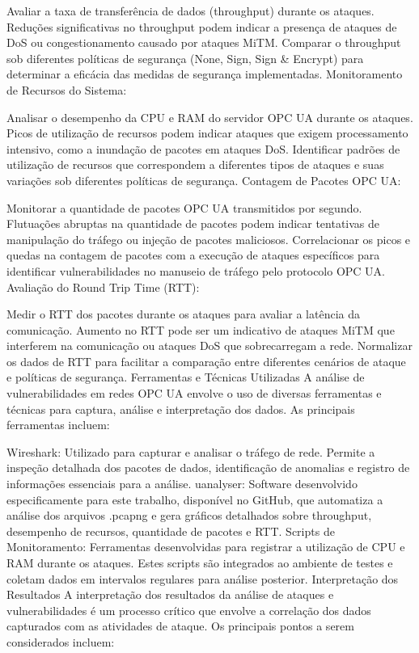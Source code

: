{    Avaliar a taxa de transferência de dados (throughput) durante os ataques. Reduções significativas no throughput podem indicar a presença de ataques de DoS ou congestionamento causado por ataques MiTM.
    Comparar o throughput sob diferentes políticas de segurança (None, Sign, Sign \& Encrypt) para determinar a eficácia das medidas de segurança implementadas.
    Monitoramento de Recursos do Sistema:

    Analisar o desempenho da CPU e RAM do servidor OPC UA durante os ataques. Picos de utilização de recursos podem indicar ataques que exigem processamento intensivo, como a inundação de pacotes em ataques DoS.
    Identificar padrões de utilização de recursos que correspondem a diferentes tipos de ataques e suas variações sob diferentes políticas de segurança.
    Contagem de Pacotes OPC UA:

    Monitorar a quantidade de pacotes OPC UA transmitidos por segundo. Flutuações abruptas na quantidade de pacotes podem indicar tentativas de manipulação do tráfego ou injeção de pacotes maliciosos.
    Correlacionar os picos e quedas na contagem de pacotes com a execução de ataques específicos para identificar vulnerabilidades no manuseio de tráfego pelo protocolo OPC UA.
    Avaliação do Round Trip Time (RTT):

    Medir o RTT dos pacotes durante os ataques para avaliar a latência da comunicação. Aumento no RTT pode ser um indicativo de ataques MiTM que interferem na comunicação ou ataques DoS que sobrecarregam a rede.
    Normalizar os dados de RTT para facilitar a comparação entre diferentes cenários de ataque e políticas de segurança.
    Ferramentas e Técnicas Utilizadas
    A análise de vulnerabilidades em redes OPC UA envolve o uso de diversas ferramentas e técnicas para captura, análise e interpretação dos dados. As principais ferramentas incluem:

    Wireshark: Utilizado para capturar e analisar o tráfego de rede. Permite a inspeção detalhada dos pacotes de dados, identificação de anomalias e registro de informações essenciais para a análise.
    uanalyser: Software desenvolvido especificamente para este trabalho, disponível no GitHub, que automatiza a análise dos arquivos .pcapng e gera gráficos detalhados sobre throughput, desempenho de recursos, quantidade de pacotes e RTT.
    Scripts de Monitoramento: Ferramentas desenvolvidas para registrar a utilização de CPU e RAM durante os ataques. Estes scripts são integrados ao ambiente de testes e coletam dados em intervalos regulares para análise posterior.
    Interpretação dos Resultados
    A interpretação dos resultados da análise de ataques e vulnerabilidades é um processo crítico que envolve a correlação dos dados capturados com as atividades de ataque. Os principais pontos a serem considerados incluem:

}
